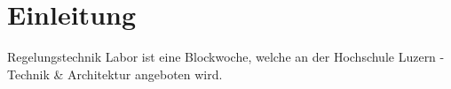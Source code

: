 \section*{Einleitung}
Regelungstechnik Labor ist eine Blockwoche, welche an der Hochschule Luzern - 
Technik \& Architektur angeboten wird. 
